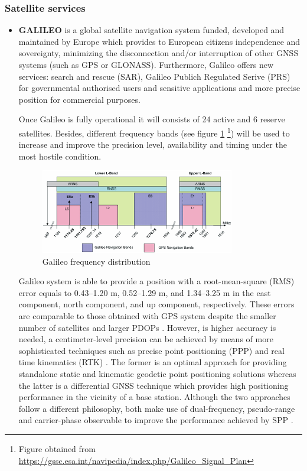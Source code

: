 \subsubsection{Satellite services}
\begin{itemize}
    \item \textbf{GALILEO} \color{blue} is a global satellite navigation system funded, developed and maintained by Europe which provides to European citizens independence and sovereignty, minimizing the disconnection and/or interruption of other GNSS systems (such as GPS or GLONASS). Furthermore, Galileo offers new services: search and rescue (SAR), Galileo Publich Regulated Serive (PRS) for governmental authorised users and sensitive applications and more precise position for commercial purposes.   
    
    Once Galileo is fully operational it will consists of 24 active and 6 reserve satellites. Besides, different frequency bands (see figure \ref{fig:frequency_plan} \footnote{Figure obtained from \url{https://gssc.esa.int/navipedia/index.php/Galileo_Signal_Plan}}) will be used to increase and improve the precision level, availability and timing under the most hostile condition. 
    
    \begin{figure}
    	\centering
    	\includegraphics[width=0.8\textwidth]{images/Galileo_Frequency_Plan.png}
    	\caption{Galileo frequency distribution}
    	\label{fig:frequency_plan}
    \end{figure} 
    
    Galileo system is able to provide a position with a root-mean-square (RMS) error equals to 0.43–1.20 m, 0.52–1.29 m, and 1.34–3.25 m in the east component, north component, and up component, respectively. These errors are comparable to those obtained with GPS system despite the smaller number of satellites and larger PDOPs \cite{Gal_pos}. However, is higher accuracy is needed, a centimeter-level precision can be achieved by means of more sophisticated techniques such as precise point positioning (PPP) \cite{PPP} and  real time kinematics (RTK) \cite{RTK1, RTK2}. The former is an optimal approach for providing standalone static and kinematic geodetic point positioning solutions whereas the latter is a differential GNSS technique which provides high positioning performance in the vicinity of a base station. Although the two approaches follow a different philosophy, both make use of dual-frequency, pseudo-range and carrier-phase observable to improve the performance achieved by SPP \cite{nav_PPP, nav_RTK}.     


\end{itemize}
